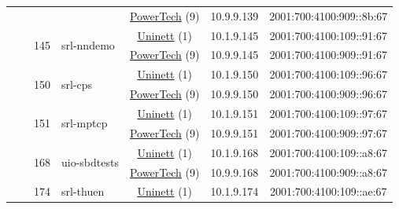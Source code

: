 \begin{small}
\begin{center}
\begin{longtable}{|c|c|c|c|c|c|c|c|}
  &  &  &  & \multicolumn{2}{|c|}{\tiny{\href{http://www.powertech.no}{PowerTech} (9)}} & \tiny{10.9.9.139} & \tiny{2001:700:4100:909::8b:67} \\* \cline{3-3}\cline{4-4}\cline{5-5}\cline{6-6}\cline{7-7}\cline{8-8}
  &  & \multirow{2}{*}{\tiny{145}} & \multicolumn{1}{|l|}{\multirow{2}{*}{\tiny{srl-nndemo}}} & \multicolumn{2}{|c|}{\tiny{\href{https://www.uninett.no}{Uninett} (1)}} & \tiny{10.1.9.145} & \tiny{2001:700:4100:109::91:67} \\* \cline{5-5}\cline{6-6}\cline{7-7}\cline{8-8}
  &  &  &  & \multicolumn{2}{|c|}{\tiny{\href{http://www.powertech.no}{PowerTech} (9)}} & \tiny{10.9.9.145} & \tiny{2001:700:4100:909::91:67} \\* \cline{3-3}\cline{4-4}\cline{5-5}\cline{6-6}\cline{7-7}\cline{8-8}
  &  & \multirow{2}{*}{\tiny{150}} & \multicolumn{1}{|l|}{\multirow{2}{*}{\tiny{srl-cps}}} & \multicolumn{2}{|c|}{\tiny{\href{https://www.uninett.no}{Uninett} (1)}} & \tiny{10.1.9.150} & \tiny{2001:700:4100:109::96:67} \\* \cline{5-5}\cline{6-6}\cline{7-7}\cline{8-8}
  &  &  &  & \multicolumn{2}{|c|}{\tiny{\href{http://www.powertech.no}{PowerTech} (9)}} & \tiny{10.9.9.150} & \tiny{2001:700:4100:909::96:67} \\* \cline{3-3}\cline{4-4}\cline{5-5}\cline{6-6}\cline{7-7}\cline{8-8}
  &  & \multirow{2}{*}{\tiny{151}} & \multicolumn{1}{|l|}{\multirow{2}{*}{\tiny{srl-mptcp}}} & \multicolumn{2}{|c|}{\tiny{\href{https://www.uninett.no}{Uninett} (1)}} & \tiny{10.1.9.151} & \tiny{2001:700:4100:109::97:67} \\* \cline{5-5}\cline{6-6}\cline{7-7}\cline{8-8}
  &  &  &  & \multicolumn{2}{|c|}{\tiny{\href{http://www.powertech.no}{PowerTech} (9)}} & \tiny{10.9.9.151} & \tiny{2001:700:4100:909::97:67} \\* \cline{3-3}\cline{4-4}\cline{5-5}\cline{6-6}\cline{7-7}\cline{8-8}
  &  & \multirow{2}{*}{\tiny{168}} & \multicolumn{1}{|l|}{\multirow{2}{*}{\tiny{uio-sbdtests}}} & \multicolumn{2}{|c|}{\tiny{\href{https://www.uninett.no}{Uninett} (1)}} & \tiny{10.1.9.168} & \tiny{2001:700:4100:109::a8:67} \\* \cline{5-5}\cline{6-6}\cline{7-7}\cline{8-8}
  &  &  &  & \multicolumn{2}{|c|}{\tiny{\href{http://www.powertech.no}{PowerTech} (9)}} & \tiny{10.9.9.168} & \tiny{2001:700:4100:909::a8:67} \\* \cline{3-3}\cline{4-4}\cline{5-5}\cline{6-6}\cline{7-7}\cline{8-8}
  &  & \multirow{2}{*}{\tiny{174}} & \multicolumn{1}{|l|}{\multirow{2}{*}{\tiny{srl-thuen}}} & \multicolumn{2}{|c|}{\tiny{\href{https://www.uninett.no}{Uninett} (1)}} & \tiny{10.1.9.174} & \tiny{2001:700:4100:109::ae:67} \\* \cline{5-5}\cline{6-6}\cline{7-7}\cline{8-8}

\end{longtable}
\end{center}
\end{small}
